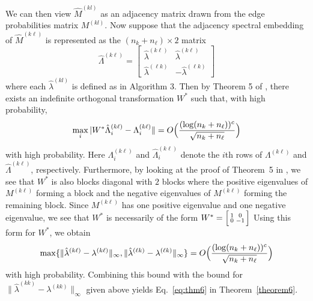 \documentclass[12pt]{article}
\begin{document}
We can then view \(\hat{M}^{(kl)}\) as an adjacency matrix drawn from
the edge probabilities matrix \(M^{(kl)}\). Now suppose that the adjacency spectral
embedding of $\hat{M}^{(k \ell)}$ is represented as the $(n_k +
n_{\ell}) \times 2$ matrix
\[\hat{\Lambda}^{(k \ell)} = \begin{bmatrix} 
  \hat{\lambda}^{(k \ell)} & \hat{\lambda}^{(k \ell)} \\ 
  \hat{\lambda}^{(\ell k)} & -\hat{\lambda}^{(\ell k)} 
\end{bmatrix}\]
where each \(\hat{\lambda}^{(kl)}\) is defined as in Algorithm 3. Then
by Theorem 5 of \citet{rubindelanchy2017statistical}, there
exists an indefinite orthogonal transformation $W^{*}$ such that,  with
high probability,
$$\max_{i} |W^{*} \hat{\Lambda}_{i}^{(k \ell)} - \Lambda_{i}^{(k \ell)} \| =
O\Bigl(\frac{(\log (n_k + n_{\ell}))^c}{\sqrt{n_k + n_{\ell}}}\Bigr)$$
with high probability. Here $\Lambda_{i}^{(k \ell)}$ and
$\hat{\Lambda}_i^{(k \ell)}$ denote the $i$th rows of $\Lambda^{(k
  \ell)}$ and $\hat{\Lambda}^{(k \ell)}$, respectively. 
Furthermore, by looking at the proof of Theorem~5 in
\cite{rubindelanchy2017statistical}, we see that $W^{*}$ is also
blocks diagonal with $2$ blocks where the positive eigenvalues of $M^{(k \ell)}$
forming a block and the negative eigenvalues of $M^{(k \ell)}$ forming
the remaining block. %
Since $M^{(k \ell)}$ has one positive eigenvalue and one negative
eigenvalue, we see that $W^{*}$ is necessarily of the form $W^{*}
= \Bigl[\begin{smallmatrix} 1 & 0 \\ 0 & - 1\end{smallmatrix}\Bigr]$
Using this form for $W^{*}$, we obtain
$$\max\{\|\hat{\lambda}^{(k \ell)} - \lambda^{(k \ell)}\|_{\infty},
\|\hat{\lambda}^{(\ell k)} - \lambda^{(\ell k)}\|_{\infty}\}  =
O\Bigl(\frac{(\log (n_k + n_{\ell}))^c}{\sqrt{n_k + n_{\ell}}}\Bigr)$$
with high probability. Combining this bound with the bound for
$\|\hat{\lambda}^{(kk)} - \lambda^{(kk)}\|_{\infty}$ given above
yields Eq.~\eqref{eq:thm6} in Theorem~\ref{theorem6}. 
\end{document}

